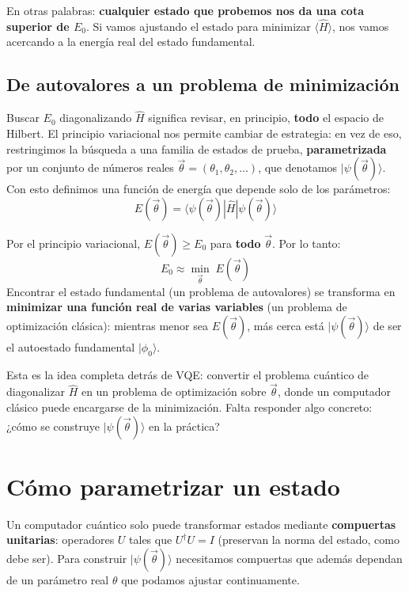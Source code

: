 \documentclass[12pt]{article}
\begin{document}
En otras palabras: \textbf{cualquier estado que probemos nos da una cota
superior de $E_0$}. Si vamos ajustando el estado para minimizar
$\langle\hat{H}\rangle$, nos vamos acercando a la energía real del estado
fundamental.

\subsection{De autovalores a un problema de minimización}

Buscar $E_0$ diagonalizando $\hat{H}$ significa revisar, en principio,
\textbf{todo} el espacio de Hilbert. El principio variacional nos permite
cambiar de estrategia: en vez de eso, restringimos la búsqueda a una
familia de estados de prueba, \textbf{parametrizada} por un conjunto de
números reales $\vec\theta = (\theta_1, \theta_2, \dots)$, que denotamos
$|\psi(\vec\theta)\rangle$. Con esto definimos una función de energía que
depende solo de los parámetros:
\[
E(\vec\theta) = \langle \psi(\vec\theta) | \hat{H} | \psi(\vec\theta) \rangle
\]

\begin{importante}
Por el principio variacional, $E(\vec\theta) \geq E_0$ para \textbf{todo}
$\vec\theta$. Por lo tanto:
\[
E_0 \approx \min_{\vec\theta} \; E(\vec\theta)
\]
Encontrar el estado fundamental (un problema de autovalores) se transforma
en \textbf{minimizar una función real de varias variables} (un problema de
optimización clásica): mientras menor sea $E(\vec\theta)$, más cerca está
$|\psi(\vec\theta)\rangle$ de ser el autoestado fundamental $|\phi_0\rangle$.
\end{importante}

Esta es la idea completa detrás de VQE: convertir el problema cuántico de
diagonalizar $\hat{H}$ en un problema de optimización sobre $\vec\theta$,
donde un computador clásico puede encargarse de la minimización. Falta
responder algo concreto: ¿cómo se construye $|\psi(\vec\theta)\rangle$ en
la práctica?

\newpage

\section{Cómo parametrizar un estado}

Un computador cuántico solo puede transformar estados mediante
\textbf{compuertas unitarias}: operadores $U$ tales que $U^\dagger U = I$
(preservan la norma del estado, como debe ser). Para construir
$|\psi(\vec\theta)\rangle$ necesitamos compuertas que además dependan de un
parámetro real $\theta$ que podamos ajustar continuamente.
\end{document}
